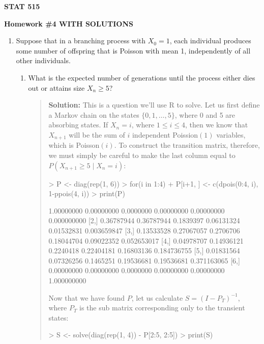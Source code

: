 \documentclass{article}
\begin{document}
\begin{center}
{\bf STAT 515}

{\bf Homework \#4 WITH SOLUTIONS}
\end{center}

\begin{enumerate}

\item Suppose that in a branching process with $X_0=1$, each individual produces
some number of offspring that is Poisson with mean 1, independently of all other
individuals.

  \begin{enumerate}

  \item What is the expected number of generations until the process either dies
  out or attains size $X_n\ge 5$?
  \begin{quotation}{\bf Solution:}
  This is a question we'll use R to solve.  Let us first define a Markov chain on the states
  $\{0, 1, \ldots, 5\}$, where 0 and 5 are absorbing states.  If $X_n=i$, where $1\le i\le 4$,
  then we know that $X_{n+1}$ will be the sum of $i$ independent Poission$(1)$ variables,
  which is Poisson$(i)$.  To construct the transition matrix, therefore, we must simply be careful
  to make the last column equal to $P(X_{n+1} \ge 5 \mid X_n=i)$:
\begin{Schunk}
\begin{Sinput}
> P <- diag(rep(1, 6))
> for(i in 1:4) 
+   P[i+1, ] <- c(dpois(0:4, i), 1-ppois(4, i))
> print(P)
\end{Sinput}
\begin{Soutput}
           [,1]       [,2]      [,3]       [,4]       [,5]        [,6]
[1,] 1.00000000 0.00000000 0.0000000 0.00000000 0.00000000 0.000000000
[2,] 0.36787944 0.36787944 0.1839397 0.06131324 0.01532831 0.003659847
[3,] 0.13533528 0.27067057 0.2706706 0.18044704 0.09022352 0.052653017
[4,] 0.04978707 0.14936121 0.2240418 0.22404181 0.16803136 0.184736755
[5,] 0.01831564 0.07326256 0.1465251 0.19536681 0.19536681 0.371163065
[6,] 0.00000000 0.00000000 0.0000000 0.00000000 0.00000000 1.000000000
\end{Soutput}
\end{Schunk}
  Now that we have found $P$, let us calculate $S=(I-P_T)^{-1}$, where $P_T$ is the
  sub matrix corresponding only to the transient states:
\begin{Schunk}
\begin{Sinput}
> S <- solve(diag(rep(1, 4)) - P[2:5, 2:5])
> print(S)
\end{Sinput}

\end{Schunk}
\end{quotation}
\end{enumerate}
\end{enumerate}
\end{document}
